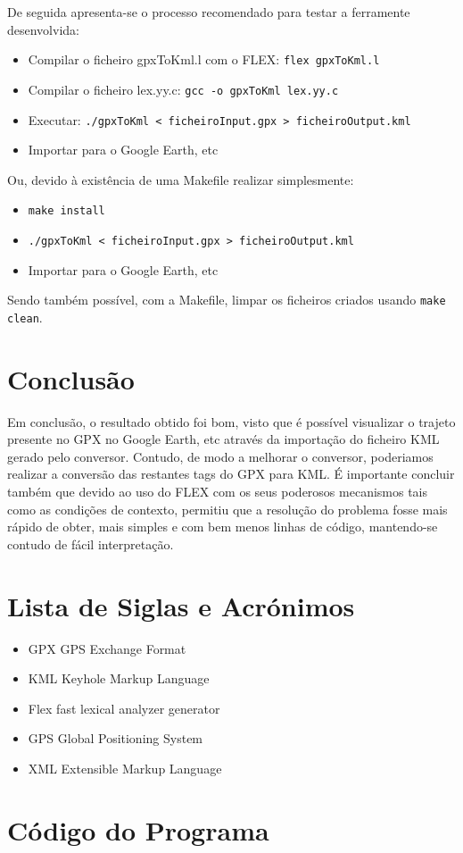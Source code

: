 \documentclass{llncs}
\begin{document}
De seguida apresenta-se o processo recomendado para testar a ferramente desenvolvida:
\begin{itemize}
    \item Compilar o ficheiro gpxToKml.l com o FLEX: \verb|flex gpxToKml.l|
    \item Compilar o ficheiro lex.yy.c: \verb|gcc -o gpxToKml lex.yy.c|
    \item Executar: \verb|./gpxToKml < ficheiroInput.gpx > ficheiroOutput.kml|
    \item Importar para o Google Earth, etc
\end{itemize}

Ou, devido à existência de uma Makefile realizar simplesmente:
\begin{itemize}
    \item \verb|make install|
    \item \verb|./gpxToKml < ficheiroInput.gpx > ficheiroOutput.kml|
    \item Importar para o Google Earth, etc
\end{itemize}

Sendo também possível, com a Makefile, limpar os ficheiros criados usando \verb|make clean|.

\section{Conclusão}
Em conclusão, o resultado obtido foi bom, visto que é possível visualizar o trajeto presente no GPX no Google Earth, etc através da importação do ficheiro KML gerado pelo conversor. Contudo, de modo a melhorar o conversor, poderiamos realizar a conversão das restantes tags do GPX para KML. É importante concluir também que devido ao uso do FLEX com os seus poderosos mecanismos tais como as condições de contexto, permitiu que a resolução do problema fosse mais rápido de obter, mais simples e com bem menos linhas de código, mantendo-se contudo de fácil interpretação.

\section{Lista de Siglas e Acrónimos}
\begin{itemize}
    \item GPX   GPS Exchange Format
    \item KML   Keyhole Markup Language
    \item Flex  fast lexical analyzer generator
    \item GPS   Global Positioning System
    \item XML   Extensible Markup Language
\end{itemize}

\appendix
\section{Código do Programa}
\end{document}
